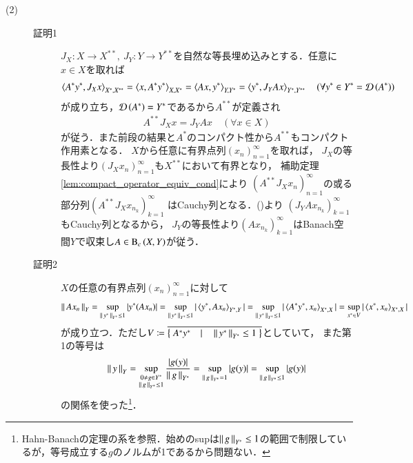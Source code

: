 \begin{prf}
\begin{description}
			\item[(2)]
				\begin{description}
					\item[証明1]
						$J_X:X \longrightarrow X^{**},\ J_Y:Y \longrightarrow Y^{**}$を自然な等長埋め込みとする．任意に$x \in X$を取れば
						\begin{align}
							\inprod<A^*y^*, J_Xx>_{X^*,X^{**}} = \inprod<x,A^*y^*>_{X,X^*} = \inprod<Ax,y^*>_{Y,Y^*} = \inprod<y^*,J_YAx>_{Y^*,Y^{**}} \quad (\forall y^* \in Y^*=\Dom{A^*} )
						\end{align}
						が成り立ち，$\Dom{A^*} = Y^*$であるから$A^{**}$が定義され
						\begin{align}
							A^{**} J_X x = J_Y A x \quad (\forall x \in X)
							\label{eq:thm_dual_operator_of_compact_operators}
						\end{align}
						が従う．また前段の結果と$A^*$のコンパクト性から$A^{**}$もコンパクト作用素となる．
						$X$から任意に有界点列$(x_n)_{n=1}^{\infty}$を取れば，
						$J_X$の等長性より$\left(J_Xx_n\right)_{n=1}^{\infty}$も$X^{**}$において有界となり，
						補助定理\ref{lem:compact_operator_equiv_cond}により
						$\left(A^{**}J_Xx_n\right)_{n=1}^{\infty}$の或る部分列$\left(A^{**}J_Xx_{n_k}\right)_{k=1}^{\infty}$
						はCauchy列となる．()より
						$\left(J_YAx_{n_k}\right)_{k=1}^{\infty}$もCauchy列となるから，
						$J_Y$の等長性より$\left(Ax_{n_k}\right)_{k=1}^{\infty}$はBanach空間$Y$で収束し$A \in \mathrm{B}_c\left(X,Y\right) $が従う．
					\item[証明2]
						$X$の任意の有界点列$(x_n)_{n=1}^{\infty}$に対して
						\begin{align}
							\Norm{Ax_n}{Y} = \sup{\Norm{y^*}{Y^*} \leq 1}{|y^*(Ax_n)|}
							= \sup{\Norm{y^*}{Y^*} \leq 1}{|\inprod<y^*,Ax_n>_{Y^*,Y}|}
							= \sup{\Norm{y^*}{Y^*} \leq 1}{|\inprod<A^*y^*,x_n>_{X^*,X}|}
							= \sup{x^* \in V}{|\inprod<x^*,x_n>_{X^*,X}|}
						\end{align}
						が成り立つ．ただし$V \coloneqq \closure{\left\{\ A^*y^*\quad |\quad \Norm{y^*}{Y^*} \leq 1\ \right\}}$としていて，
						また第1の等号は
						\begin{align}
							\left\|\, y\, \right\|_{Y} = \operatorname*{sup}_{\substack{0 \neq g \in Y^* \\ \left\|\, g\, \right\|_{Y^*}\leq1}} \frac{|g(y)|}{\left\|\, g\, \right\|_{Y^*}} 
							= \operatorname*{sup}_{\left\|\, g\, \right\|_{Y^*}=1} |g(y)| = \operatorname*{sup}_{\left\|\, g\, \right\|_{Y^*} \leq 1} |g(y)|
						\end{align}
						の関係を使った\footnote{Hahn-Banachの定理の系を参照．始めのsupは$\left\|\, g\, \right\|_{Y^*}\leq1$の範囲で制限しているが，等号成立する$g$のノルムが1であるから問題ない．}．

\end{description}
\end{description}
\end{prf}
